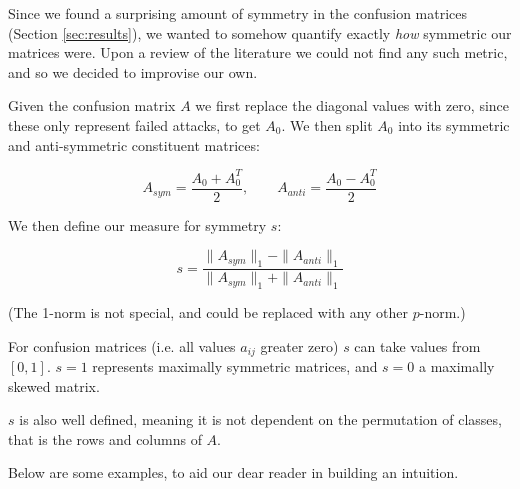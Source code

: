 \documentclass{article}
\begin{document}
Since we found a surprising amount of symmetry in the confusion matrices (Section \ref{sec:results}), we wanted to somehow quantify exactly \textit{how} symmetric our matrices were. Upon a review of the literature we could not find any such metric, and so we decided to improvise our own.

Given the confusion matrix $A$ we first replace the diagonal values with zero, since these only represent failed attacks, to get $A_0$. We then split $A_0$ into its symmetric and anti-symmetric constituent matrices:

\begin{equation}
	A_{sym} = \frac{A_0 + A_0^T}{2}, \qquad
	A_{anti} = \frac{A_0 - A_0^T}{2}
\end{equation}

We then define our measure for symmetry $s$:

\begin{equation}
	s = \frac{ \|A_{sym}\|_1 - \|A_{anti}\|_1}{\|A_{sym}\|_1 + \|A_{anti}\|_1}
\end{equation}

(The 1-norm is not special, and could be replaced with any other $p$-norm.)

For confusion matrices (i.e. all values $a_{ij}$ greater zero) $s$ can take values from $[0,1]$. $s = 1$ represents maximally symmetric matrices, and $s = 0$ a maximally skewed matrix.

$s$ is also well defined, meaning it is not dependent on the permutation of classes, that is the rows and columns of $A$.

Below are some examples, to aid our dear reader in building an intuition.
\end{document}
